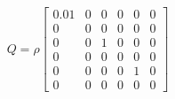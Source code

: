 \documentclass[preview]{standalone}
\begin{document}
\begin{align*}
Q = \rho \left[\begin{matrix}0.01 & 0 & 0 & 0 & 0 & 0\\0 & 0 & 0 & 0 & 0 & 0\\0 & 0 & 1 & 0 & 0 & 0\\0 & 0 & 0 & 0 & 0 & 0\\0 & 0 & 0 & 0 & 1 & 0\\0 & 0 & 0 & 0 & 0 & 0\end{matrix}\right]
\end{align*}
\end{document}
